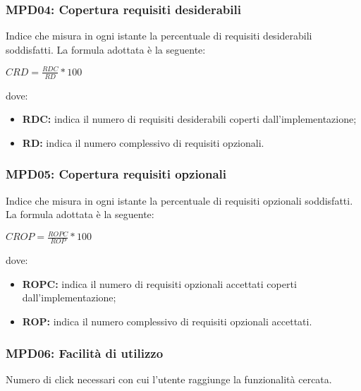 \subsubsection{MPD04: Copertura requisiti desiderabili}
Indice che misura in ogni istante la percentuale di requisiti desiderabili soddisfatti.
La formula adottata è la seguente:
\begin{center}
    $CRD = \displaystyle \frac{RDC}{RD}*100$
\end{center}
dove:
\begin{itemize}
    \item \textbf{RDC:} indica il numero di requisiti desiderabili coperti dall'implementazione;
    \item \textbf{RD:} indica il numero complessivo di requisiti opzionali.
\end{itemize}

\subsubsection{MPD05: Copertura requisiti opzionali}
Indice che misura in ogni istante la percentuale di requisiti opzionali soddisfatti.
La formula adottata è la seguente:
\begin{center}
    $CROP = \displaystyle \frac{ROPC}{ROP}*100$
\end{center}
dove:
\begin{itemize}
    \item \textbf{ROPC:} indica il numero di requisiti opzionali accettati coperti dall'implementazione;
    \item \textbf{ROP:} indica il numero complessivo di requisiti opzionali accettati.
\end{itemize}

\subsubsection{MPD06: Facilità di utilizzo}
Numero di click necessari con cui l'utente raggiunge la funzionalità cercata.

